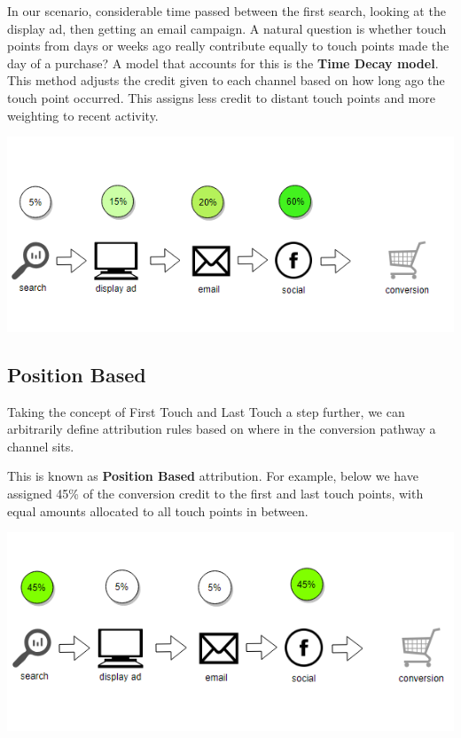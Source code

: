 \documentclass[]{book}
\begin{document}
In our scenario, considerable time passed between the first search,
looking at the display ad, then getting an email campaign. A natural
question is whether touch points from days or weeks ago really
contribute equally to touch points made the day of a purchase? A model
that accounts for this is the \textbf{Time Decay model}. This method
adjusts the credit given to each channel based on how long ago the touch
point occurred. This assigns less credit to distant touch points and
more weighting to recent activity.

\includegraphics[width=5.92in]{img/time_decay}

\subsection{Position Based}\label{position-based}

Taking the concept of First Touch and Last Touch a step further, we can
arbitrarily define attribution rules based on where in the conversion
pathway a channel sits.

This is known as \textbf{Position Based} attribution. For example, below
we have assigned 45\% of the conversion credit to the first and last
touch points, with equal amounts allocated to all touch points in
between.

\includegraphics[width=5.73in]{img/position_based}
\end{document}
